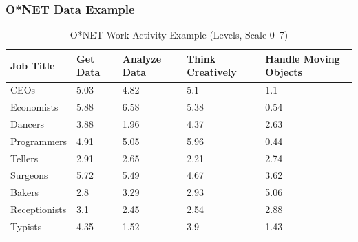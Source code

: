 \documentclass[red]{beamer}
\begin{document}
\begin{frame}
\frametitle{O*NET Data Example}
\begin{table}[htbp]
\begin{tabular}{|p{2cm}|p{1.65cm}|p{1.5cm}|p{1.5cm}|p{1.5cm}|}
\hline
{Job Title} & {Get Data} & {Analyze Data} & {\small Think Creatively} & {Handle Moving Objects} \\ \hline
{CEOs} & 5.03 & 4.82 & 5.1 & 1.1  \\ \hline
{Economists} & 5.88 & 6.58 & 5.38 & 0.54 \\ \hline
{Dancers} & 3.88 & 1.96 & 4.37 & 2.63 \\ \hline
{Programmers} & 4.91 & 5.05 & 5.96 & 0.44 \\ \hline
{Tellers} & 2.91 & 2.65 & 2.21 & 2.74 \\ \hline
{Surgeons} & 5.72 & 5.49 & 4.67 & 3.62 \\ \hline
{Bakers} & 2.8 & 3.29 & 2.93 & 5.06 \\ \hline
{Receptionists} & 3.1 & 2.45 & 2.54 & 2.88 \\ \hline
{Typists} & 4.35 & 1.52 & 3.9 & 1.43 \\ \hline
\end{tabular}
\caption{O*NET Work Activity Example (Levels, Scale 0--7)}
\label{onetex}
\end{table}
\end{frame}
\end{document}

